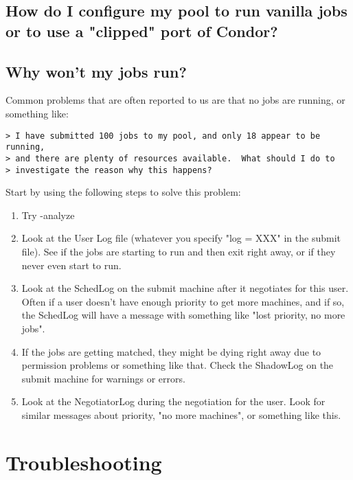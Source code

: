 \subsection{How do I configure my pool to run vanilla jobs or to use a "clipped" port of Condor?}

\Todo

\subsection{Why won't my jobs run?}

Common problems that are often reported to us are that no jobs are running, or
something like:

\begin{verbatim}
> I have submitted 100 jobs to my pool, and only 18 appear to be running,
> and there are plenty of resources available.  What should I do to
> investigate the reason why this happens?
\end{verbatim}

Start by using the following steps to solve this problem:

\begin{enumerate}
\item Try  -analyze 

\item Look at the User Log file (whatever you specify "log = XXX" in the
submit file).  See if the jobs are starting to run and then exit right
away, or if they never even start to run.

\item Look at the SchedLog on the submit machine after it negotiates
for this user.  Often if a user doesn't have enough priority to get
more machines, and if so, the SchedLog will have a message with something
like "lost priority, no more jobs".

\item If the jobs are getting matched, they might be dying right away due
to permission problems or something like that.  Check the ShadowLog on
the submit machine for warnings or errors.

\item Look at the NegotiatorLog during the negotiation for the user.
Look for similar messages about priority, "no more machines", or
something like this.  

\end{enumerate}

\section{Troubleshooting}


